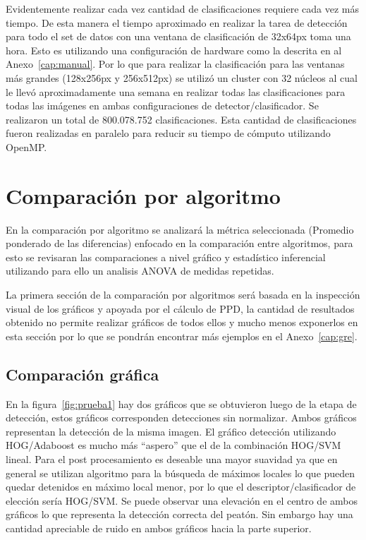 Evidentemente realizar cada vez cantidad de clasificaciones requiere cada vez más tiempo. De esta manera el tiempo aproximado en realizar la tarea de detección para todo el set de datos con una ventana de clasificación de 32x64px toma una hora. Esto es utilizando una configuración de hardware como la descrita en al Anexo~\ref{cap:manual}. Por lo que para realizar la clasificación para las ventanas más grandes (128x256px y 256x512px) se utilizó un cluster con 32 núcleos al cual le llevó aproximadamente una semana en realizar todas las clasificaciones para todas las imágenes en ambas configuraciones de detector/clasificador. Se realizaron un total de 800.078.752 clasificaciones. Esta cantidad de clasificaciones fueron realizadas en paralelo para reducir su tiempo de cómputo utilizando OpenMP.

\section{Comparación por algoritmo}
\label{analisis:compalgoritmo}

En la comparación por algoritmo se analizará la métrica seleccionada (Promedio ponderado de las diferencias) enfocado en la comparación entre algoritmos, para esto se revisaran las comparaciones a nivel gráfico y estadístico inferencial utilizando para ello un analisis ANOVA de medidas repetidas. 

La primera sección de la comparación por algoritmos será basada en la inspección visual de los gráficos y apoyada por el cálculo de PPD, la cantidad de resultados obtenido no permite realizar gráficos de todos ellos y mucho menos exponerlos en esta sección por lo que se pondrán encontrar más ejemplos en el Anexo~\ref{cap:gre}. 

\subsection{Comparación gráfica}

En la figura~\ref{fig:prueba1} hay dos gráficos que se obtuvieron luego de la etapa de detección, estos gráficos corresponden detecciones sin normalizar. Ambos gráficos representan la detección de la misma imagen. El gráfico detección utilizando HOG/Adaboost es mucho más ``aspero'' que el de la combinación HOG/SVM lineal. Para el post procesamiento es deseable una mayor suavidad ya que en general se utilizan algoritmo para la búsqueda de máximos locales lo que pueden quedar detenidos en máximo local menor, por lo que el descriptor/clasificador de elección sería HOG/SVM. Se puede observar una elevación en el centro de ambos gráficos lo que representa la detección correcta del peatón. Sin embargo hay una cantidad apreciable de ruido en ambos gráficos hacia la parte superior. 

